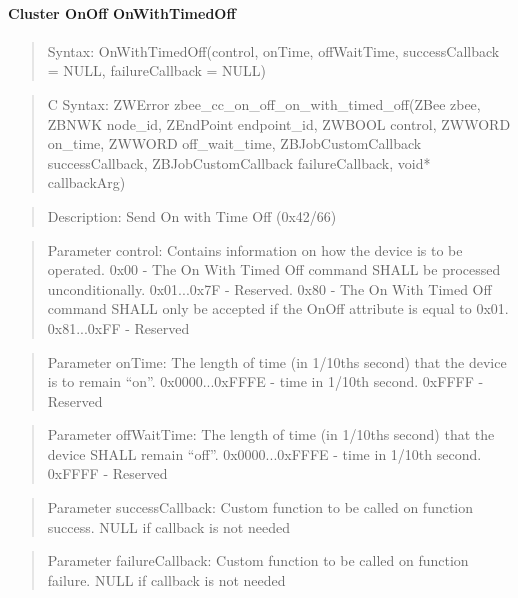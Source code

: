 \paragraph{Cluster OnOff OnWithTimedOff}
\begin{quote}Syntax: OnWithTimedOff(control, onTime, offWaitTime, successCallback = NULL, failureCallback = NULL)\end{quote}
\begin{quote}C Syntax: ZWError zbee\_cc\_on\_off\_on\_with\_timed\_off(ZBee zbee, ZBNWK node\_id, ZEndPoint endpoint\_id, ZWBOOL control, ZWWORD on\_time, ZWWORD off\_wait\_time, ZBJobCustomCallback successCallback, ZBJobCustomCallback failureCallback, void* callbackArg)\end{quote}
\begin{quote}Description: Send On with Time Off (0x42/66)\end{quote}
\begin{quote}Parameter control: Contains information on how the device is to be operated. 0x00        -  The On With Timed Off command SHALL be processed unconditionally. 0x01...0x7F - Reserved. 0x80        - The On With Timed Off command SHALL only be accepted if the OnOff attribute is equal to 0x01. 0x81...0xFF - Reserved\end{quote}
\begin{quote}Parameter onTime: The length of time (in 1/10ths second) that the device is to remain “on”. 0x0000...0xFFFE - time in 1/10th second. 0xFFFF          - Reserved\end{quote}
\begin{quote}Parameter offWaitTime: The length of time (in 1/10ths second) that the device SHALL remain “off”. 0x0000...0xFFFE - time in 1/10th second. 0xFFFF          - Reserved\end{quote}
\begin{quote}Parameter successCallback: Custom function to be called on function success. NULL if callback is not needed\end{quote}
\begin{quote}Parameter failureCallback: Custom function to be called on function failure. NULL if callback is not needed\end{quote}


